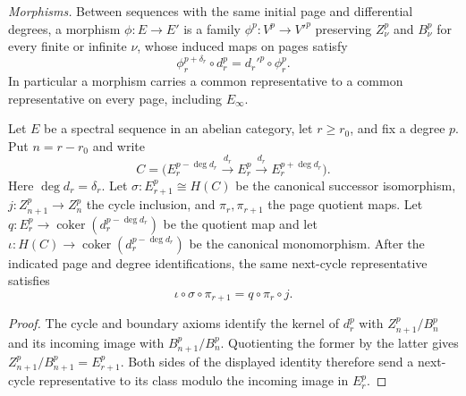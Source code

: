 \begin{definition}
\textit{Morphisms.} Between sequences with the same initial page and differential degrees, a morphism $\phi:E\to E'$ is a family $\phi^p:V^p\to V'^p$ preserving $Z_\nu^p$ and $B_\nu^p$ for every finite or infinite $\nu$, whose induced maps on pages satisfy
\[
 \phi_r^{p+\delta_r}\circ d_r^p=d_r'^p\circ\phi_r^p.
\]
In particular a morphism carries a common representative to a common representative on every page, including $E_\infty$.
\end{definition}





\begin{theorem}
\label{sem:SpectralSequence:successor-representative}
Let $E$ be a spectral sequence in an abelian category, let $r\geq r_0$,
and fix a degree $p$. Put $n=r-r_0$ and write
\[
C=\bigl(E_r^{p-\deg d_r}\xrightarrow{d_r}E_r^p
\xrightarrow{d_r}E_r^{p+\deg d_r}\bigr).
\]
Here $\deg d_r=\delta_r$. Let
$\sigma:E_{r+1}^p\cong H(C)$ be the canonical successor isomorphism,
$j:Z_{n+1}^p\to Z_n^p$ the cycle inclusion, and $\pi_r,\pi_{r+1}$ the
page quotient maps. Let $q:E_r^p\to\operatorname{coker}(d_r^{p-\deg d_r})$
be the quotient map and let $\iota:H(C)\to\operatorname{coker}(d_r^{p-\deg d_r})$
be the canonical monomorphism. After the indicated page and degree
identifications, the same next-cycle representative satisfies
\[
\iota\circ\sigma\circ\pi_{r+1}=q\circ\pi_r\circ j.
\]
\end{theorem}
\begin{proof}
The cycle and boundary axioms identify the kernel of $d_r^p$ with
$Z_{n+1}^p/B_n^p$ and its incoming image with
$B_{n+1}^p/B_n^p$. Quotienting the former by the latter gives
$Z_{n+1}^p/B_{n+1}^p=E_{r+1}^p$. Both sides of the displayed identity
therefore send a next-cycle representative to its class modulo the
incoming image in $E_r^p$.
\end{proof}

